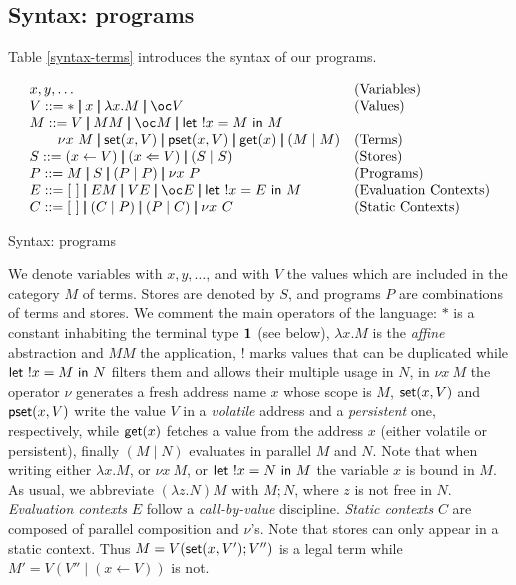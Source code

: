 \documentclass[11pt]{article}
\newcommand{\letm}[3]{{\sf let} \ ! #1 = #2 \ {\sf in} \ #3}    \newcommand{\tertype}{{\bf 1}}
\newcommand{\pst}[2]{{\sf pset}(#1,#2)}
\newcommand{\st}[2]{{\sf set}(#1,#2)}
\newcommand{\get}[1]{{\sf get}(#1)}
\newcommand{\new}[2]{\nu #1 \ #2}
\newcommand{\store}[2]{(#1 \leftarrow #2)}
\newcommand{\pstore}[2]{(#1 \Leftarrow #2)}
\begin{document}
\subsection{Syntax: programs}
Table \ref{syntax-terms} introduces the syntax of our programs.
\begin{table}
{\footnotesize
\[
\begin{array}{ll}

x,y,\ldots                                            &\mbox{(Variables)} \\
V::= * \Alt x \Alt \lambda x.M \Alt \bang V                &\mbox{(Values)}\\
M::= V \Alt MM \Alt \bang M \Alt \letm{x}{M}{M}            \\
\qquad \new{x}{M} \Alt \st{x}{V} \Alt \pst{x}{V} \Alt \get{x} \Alt (M\mid M) &\mbox{(Terms)}\\ 
S::= \store{x}{V} \Alt \pstore{x}{V} \Alt (S\mid S)   &\mbox{(Stores)} \\
P::= M \Alt S \Alt (P\mid P) \Alt \new{x}{P}          &\mbox{(Programs)}  \\
E::=[~]\Alt EM \Alt VE \Alt \bang E \Alt \letm{x}{E}{M}      &\mbox{(Evaluation Contexts)} \\
C::= [~] \Alt (C\mid P) \Alt (P\mid C) \Alt \new{x}{C}  &\mbox{(Static Contexts)}

\end{array}
\]}
\caption{Syntax: programs}\label{syntax-terms}
\end{table}
We denote variables with $x,y,\ldots$, and  with $V$ the values
which are included in the category $M$ of terms. Stores are denoted by
$S$, and programs $P$ are combinations of terms and stores.  We comment
the main operators of the language: $*$ is a constant inhabiting
the terminal type $\tertype$ (see below), $\lambda x.M$ is the {\em
affine} abstraction and $MM$ the application, $!$ marks values that
can be duplicated while $\letm{x}{M}{N}$ filters them and
allows their multiple usage in $N$, in $\new{x}{M}$ the operator $\nu$
generates a fresh address name $x$ whose scope is $M$, $\st{x}{V}$ and
$\pst{x}{V}$ write the value $V$ in a {\em volatile} address and a {\em
persistent} one, respectively, while $\get{x}$ fetches a value from
the address $x$ (either volatile or persistent), finally $(M\mid N)$
evaluates in parallel $M$ and $N$.
Note that when writing either $\lambda x.M$, or $\new{x}{M}$, or $\letm{x}{N}{M}$ the
variable $x$ is bound in $M$. 
As usual, we abbreviate $(\lambda z.N)M$ with $M;N$, where $z$ is not free in $N$.
{\em Evaluation contexts} $E$ follow a {\em call-by-value} discipline.
{\em Static contexts} $C$ are composed of parallel composition and $\nu$'s.
Note that stores can only appear in a static context. Thus 
$M=V(\st{x}{V'};V'')$ is a legal term while  $M'=V(V''\mid \store{x}{V})$ is not. 
\end{document}
